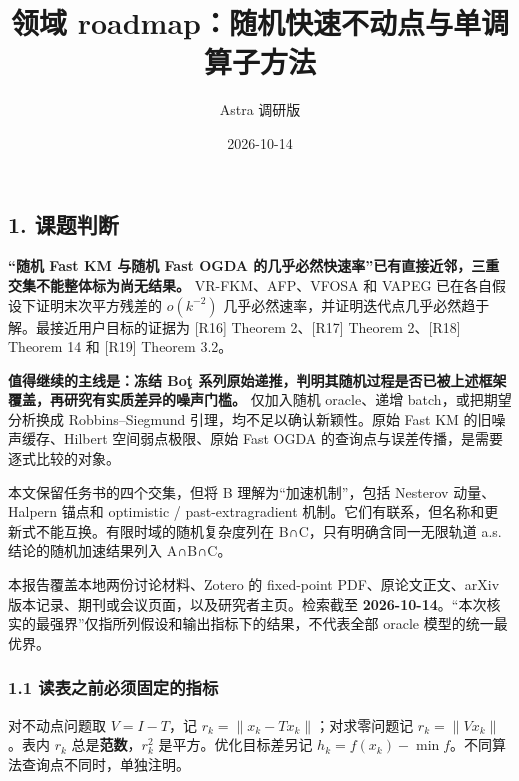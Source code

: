 \documentclass[
  chinese,
  10pt,
  a4paper,
]{article}
\title{领域 roadmap：随机快速不动点与单调算子方法}
\author{Astra 调研版}
\date{2026-10-14}
\begin{document}
\maketitle

\renewcommand*\contentsname{目录}
{
\setcounter{tocdepth}{2}
\tableofcontents
}
\subsection{1. 课题判断}\label{ux8bfeux9898ux5224ux65ad}

\textbf{``随机 Fast KM 与随机 Fast OGDA
的几乎必然快速率''已有直接近邻，三重交集不能整体标为尚无结果。}
VR-FKM、AFP、VFOSA 和 VAPEG 已在各自假设下证明末次平方残差的
\(o(k^{-2})\)
几乎必然速率，并证明迭代点几乎必然趋于解。最接近用户目标的证据为
{[}R16{]} Theorem 2、{[}R17{]} Theorem 2、{[}R18{]} Theorem 14 和
{[}R19{]} Theorem 3.2。

\textbf{值得继续的主线是：冻结 Boţ
系列原始递推，判明其随机过程是否已被上述框架覆盖，再研究有实质差异的噪声门槛。}
仅加入随机 oracle、递增 batch，或把期望分析换成 Robbins--Siegmund
引理，均不足以确认新颖性。原始 Fast KM 的旧噪声缓存、Hilbert
空间弱点极限、原始 Fast OGDA 的查询点与误差传播，是需要逐式比较的对象。

本文保留任务书的四个交集，但将 B 理解为``加速机制''，包括 Nesterov
动量、Halpern 锚点和 optimistic / past-extragradient
机制。它们有联系，但名称和更新式不能互换。有限时域的随机复杂度列在
B∩C，只有明确含同一无限轨道 a.s. 结论的随机加速结果列入 A∩B∩C。

本报告覆盖本地两份讨论材料、Zotero 的 fixed-point PDF、原论文正文、arXiv
版本记录、期刊或会议页面，以及研究者主页。检索截至
\textbf{2026-10-14}。``本次核实的最强界''仅指所列假设和输出指标下的结果，不代表全部
oracle 模型的统一最优界。

\subsubsection{1.1
读表之前必须固定的指标}\label{ux8bfbux8868ux4e4bux524dux5fc5ux987bux56faux5b9aux7684ux6307ux6807}

对不动点问题取 \(V=I-T\)，记 \(r_k=\lVert x_k-Tx_k\rVert\)；对求零问题记
\(r_k=\lVert Vx_k\rVert\)。表内 \(r_k\) 总是\textbf{范数}，\(r_k^2\)
是平方。优化目标差另记
\(h_k=f(x_k)-\min f\)。不同算法查询点不同时，单独注明。
\end{document}
